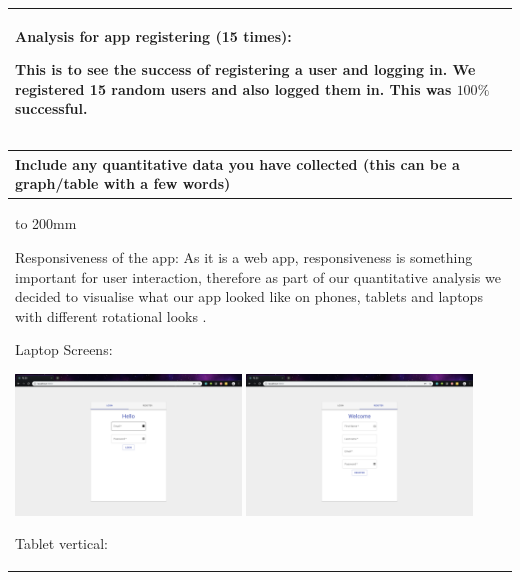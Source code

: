 \documentclass[a4paper]{article}
\newcommand{\colWidth}{141mm}
\begin{document}
\begin{center}
\begin{tabular}{|p{\colWidth}|}
{Analysis for app registering (15 times):

This is to see the success of registering a user and logging in. We registered 15 random users and also logged them in. This was $100\%$ successful.


  }
  \\
  \hline
\end{tabular}
\vskip 5mm


\begin{tabular}{|p{\colWidth}|}
	\hline
	\cellcolor{blue!25}\large
	\textbf{Include any quantitative data you have collected (this can be a graph/table with a few words)}
	\\ \hline
	\vtop to 200mm{
	\vspace{2mm}
	
	Responsiveness of the app:
As  it is a web app, responsiveness is something important for user interaction, therefore as part of our quantitative analysis we decided to visualise what our app looked like on phones, tablets and laptops with different rotational looks . \par

Laptop Screens: 

 \includegraphics[width=6cm]{laptop_login.png}
 \includegraphics[width=6cm]{laptop_register.png}
 
 Tablet vertical:
 
}
\end{tabular}
\end{center}
\end{document}
